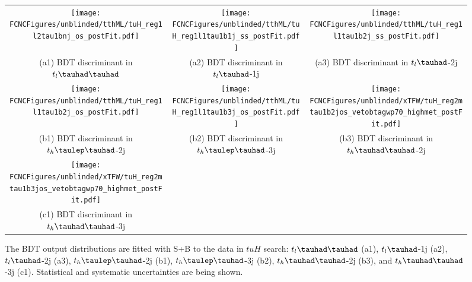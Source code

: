\begin{figure}[H]
\begin{tabular}{@{}ccc@{}}
\texttt{[image: \\FCNCFigures/unblinded/tthML/tuH\_reg1l2tau1bnj\_os\_postFit.pdf]}&
\texttt{[image: \\FCNCFigures/unblinded/tthML/tuH\_reg1l1tau1b1j\_ss\_postFit.pdf]}&
\texttt{[image: \\FCNCFigures/unblinded/tthML/tuH\_reg1l1tau1b2j\_ss\_postFit.pdf]}\\
(a1) BDT discriminant in $t_l\thadhad$ & (a2) BDT discriminant in  $t_l\tauhad$-1j& (a3) BDT discriminant in $t_l\tauhad$-2j\\
\texttt{[image: \\FCNCFigures/unblinded/tthML/tuH\_reg1l1tau1b2j\_os\_postFit.pdf]}&
\texttt{[image: \\FCNCFigures/unblinded/tthML/tuH\_reg1l1tau1b3j\_os\_postFit.pdf]}&
\texttt{[image: \\FCNCFigures/unblinded/xTFW/tuH\_reg2mtau1b2jos\_vetobtagwp70\_highmet\_postFit.pdf]}\\
(b1) BDT discriminant in $t_h\tlhad$-2j & (b2) BDT discriminant in  $t_h\tlhad$-3j & (b3) BDT discriminant in $t_h\thadhad$-2j \\
\texttt{[image: \\FCNCFigures/unblinded/xTFW/tuH\_reg2mtau1b3jos\_vetobtagwp70\_highmet\_postFit.pdf]}&\\
(c1) BDT discriminant in$t_h\thadhad$-3j\\
\end{tabular}
\caption{ The BDT output distributions are fitted with S+B to the data in $tuH$ search: $t_l\thadhad$ (a1),  $t_l\tauhad$-1j (a2),  $t_l\tauhad$-2j (a3),
  $t_h\tlhad$-2j (b1), $t_h\tlhad$-3j (b2), $t_h\thadhad$-2j (b3), and $t_h\thadhad$-3j (c1). Statistical and systematic uncertainties are being shown.}
\label{fig:asimov_postfitbdtHu}
\end{figure}

